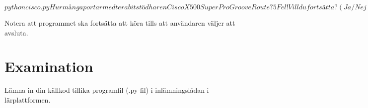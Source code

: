 \documentclass[a4paper]{miunasgn}
\begin{document}
\begin{terminal}[float,label={lst:output},caption={Exempel på utmatning från 
  programmet.}]
$ python cisco.py
Hur många portar med terabitstöd har en Cisco X500 SuperPro GrooveRoute?
5
Fel!
Vill du fortsätta? (Ja/Nej)
Ja
Vad heter Ciscos nuvarande VD?
Rutger Blinka
Fel!
Vill du fortsätta? (Ja/Nej)
Nej
Du hade 0%
$
\end{terminal}

Notera att programmet ska fortsätta att köra tills att användaren väljer att 
avsluta.


\section{Examination}
\label{sec:exam}
Lämna in din källkod tillika programfil (.py-fil) i inlämningslådan 
i lärplattformen.


\printbibliography
\end{document}
